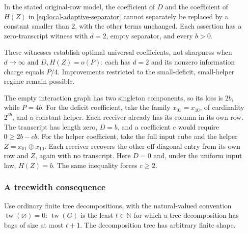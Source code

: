 \begin{theorem}\label{thm:local-separator-sharpness}
In the stated original-row model, the coefficient of $D$ and the coefficient
of $H(Z)$ in \eqref{eq:local-adaptive-separator} cannot separately be replaced
by a constant smaller than $2$, with the other terms unchanged.  Each assertion
has a zero-transcript witness with $d=2$, empty separator, and every $b>0$.
\end{theorem}
These witnesses establish optimal universal coefficients, not sharpness when
$d\to\infty$ and $D,H(Z)=o(P)$: each has $d=2$ and its nonzero information
charge equals $P/4$.  Improvements restricted to the small-deficit,
small-helper regime remain possible.
\begin{proofoutline}
The empty interaction graph has two singleton components, so its loss is
$2b$, while $P=4b$.  For the deficit coefficient, take the family
$x_{01}=x_{10}$, of cardinality $2^{3b}$, and a constant helper.  Each receiver
already has its column in its own row.  The transcript has length zero,
$D=b$, and a coefficient $c$ would require $0\ge 2b-cb$.
For the helper coefficient, take the full input cube and the helper
$Z=x_{01}\oplus x_{10}$.  Each receiver recovers the other off-diagonal
entry from its own row and $Z$, again with no transcript.  Here $D=0$ and,
under the uniform input law, $H(Z)=b$.  The same inequality forces $c\ge2$.
\end{proofoutline}

\subsubsection{A treewidth consequence}

Use ordinary finite tree decompositions, with the natural-valued convention
$\operatorname{tw}(\varnothing)=0$: $\operatorname{tw}(G)$ is the least
$t\in\mathbb N$ for which a tree decomposition has bags of size at most
$t+1$.  The decomposition tree has arbitrary finite shape.

